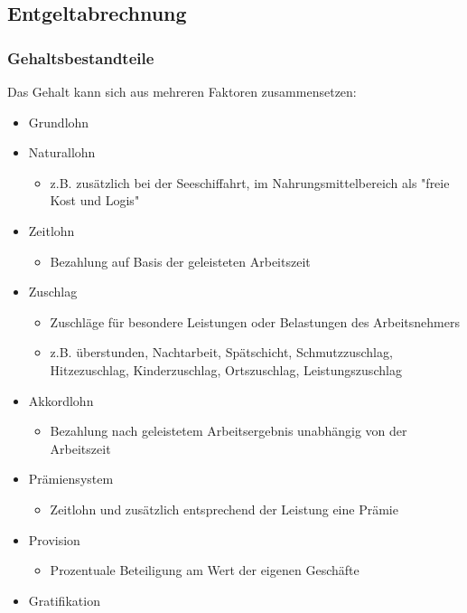 \subsection{Entgeltabrechnung}

\subsubsection{Gehaltsbestandteile} 
Das Gehalt kann sich aus mehreren Faktoren zusammensetzen:
\begin{itemize}
	\item Grundlohn
	\item Naturallohn
		\begin{itemize}
			\item z.B. zusätzlich bei der Seeschiffahrt, im Nahrungsmittelbereich als "freie Kost und Logis"
		\end{itemize}
	\item Zeitlohn
		\begin{itemize}
			\item Bezahlung auf Basis der geleisteten Arbeitszeit
		\end{itemize}
	\item Zuschlag
		\begin{itemize}
			\item Zuschläge für besondere Leistungen oder Belastungen des Arbeitsnehmers
			\item z.B. überstunden, Nachtarbeit, Spätschicht, Schmutzzuschlag, Hitzezuschlag, Kinderzuschlag, Ortszuschlag, Leistungszuschlag
		\end{itemize}
	\item Akkordlohn
		\begin{itemize}
			\item Bezahlung nach geleistetem Arbeitsergebnis unabhängig von der Arbeitszeit
		\end{itemize}
	\item Prämiensystem
		\begin{itemize}
			\item Zeitlohn und zusätzlich entsprechend der Leistung eine Prämie
		\end{itemize}
	\item Provision
		\begin{itemize}
			 \item Prozentuale Beteiligung am Wert der eigenen Geschäfte
		\end{itemize}
	\item Gratifikation
		\begin{itemize}

\end{itemize}
\end{itemize}
